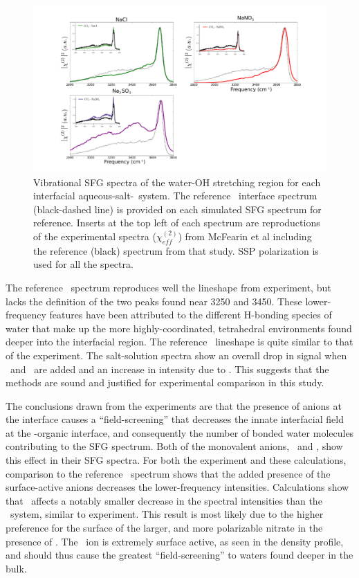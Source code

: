 \begin{figure}[h!]
\begin{center}
	\includegraphics[scale=1.0]{images/sfg-spectra.png}
	\caption{Vibrational SFG spectra of the water-OH stretching region for each interfacial aqueous-salt-\ctc~system. The reference \ctcwat~interface spectrum (black-dashed line) is provided on each simulated SFG spectrum for reference. Inserts at the top left of each spectrum are reproductions of the experimental spectra ($\chi^{(2)}_{eff}$) from McFearin et al\cite{McFearin2009} including the reference (black) spectrum from that study. SSP polarization is used for all the spectra.}
	\label{fig:sfg-spectra}
\end{center}
\end{figure}


The reference \ctcwat~spectrum reproduces well the lineshape from experiment, but lacks the definition of the two peaks found near 3250 and 3450\cm. These lower-frequency features have been attributed to the different H-bonding species of water that make up the more highly-coordinated, tetrahedral environments found deeper into the interfacial region. The reference \ctcwat~lineshape is quite similar to that of the experiment. The salt-solution spectra show an overall drop in signal when \cl~and \nit~are added and an increase in intensity due to \sul. This suggests that the methods are sound and justified for experimental comparison in this study.

The conclusions drawn from the experiments are that the presence of anions at the interface causes a ``field-screening'' that decreases the innate interfacial field at the \wat-organic interface, and consequently the number of bonded water molecules contributing to the SFG spectrum. Both of the monovalent anions, \cl~and \nit, show this effect in their SFG spectra. For both the experiment and these calculations, comparison to the reference \ctcwat~spectrum shows that the added presence of the surface-active anions decreases the lower-frequency intensities. Calculations show that \cl~affects a notably smaller decrease in the spectral intensities than the \nit~system, similar to experiment. This result is most likely due to the higher preference for the surface of the larger, and more polarizable nitrate in the presence of \ctc. The \nit~ion is extremely surface active, as seen in the density profile, and should thus cause the greatest ``field-screening'' to waters found deeper in the bulk.

